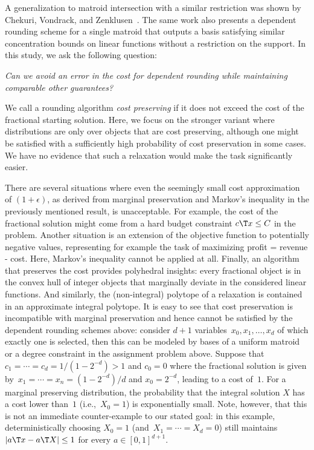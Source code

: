 A generalization to matroid intersection with a similar
restriction was shown by Chekuri, Vondrack, and Zenklusen~\cite{ChekuriVZ10}.
The same work also presents a dependent rounding
scheme for a single matroid that outputs a basis
satisfying similar concentration bounds on linear functions without a restriction on the support.
In this study, we ask the following question:
\begin{center}
    \medskip
    \emph{Can we avoid an error in the cost for dependent rounding while maintaining comparable other guarantees?}
    \medskip
\end{center}
We call a rounding algorithm \emph{cost preserving} if it does not
exceed the cost of the fractional starting solution.
Here, we focus on the stronger variant where distributions are only over objects that are cost preserving, although one might be satisfied with a sufficiently high probability of cost preservation in some
cases. We have no evidence that such a relaxation would make the task significantly easier.

There are several situations where even the seemingly
small cost approximation of $(1 + \epsilon)$, as derived from
marginal preservation and Markov's inequality in the previously mentioned result, is unacceptable. For example, the cost of the fractional solution might come from a hard budget constraint $c\T x \le C$ in the problem.
Another situation is an extension of the objective function to
potentially negative values, representing for example the task of
maximizing profit = revenue - cost. Here, Markov's inequality
cannot be applied at all. Finally, an algorithm that preserves the cost
provides polyhedral insights: every fractional object
is in the convex hull of integer objects that marginally deviate
 in the considered linear functions. And similarly, the (non-integral) polytope of a relaxation is
contained in an approximate integral polytope. 
It is easy to see that cost preservation is incompatible with marginal preservation and hence cannot be satisfied by the dependent rounding schemes above: consider $d+1$ variables~$x_0, x_1, \dotsc, x_d$
of which exactly one is selected, then this can be modeled by bases of a uniform matroid or a degree constraint in the assignment problem above.
Suppose that $c_1 = \cdots = c_{d} = 1/(1 - 2^{-d}) > 1$ and $c_0 = 0$ where the fractional solution is given by~$x_1 = \cdots = x_n = (1 - 2^{-d})/d$
and $x_0 = 2^{-d}$, leading to a cost of~$1$. For a marginal preserving distribution, the probability that the integral solution $X$ has a cost lower than~$1$ (i.e.,~$X_0 = 1$) is exponentially small.
Note, however, that this is not an immediate counter-example to our stated goal:
in this example, deterministically choosing $X_0 = 1$ (and~$X_1 = \cdots = X_d = 0$) still maintains
$|a\T x - a\T X| \le 1$ for every $a\in [0, 1]^{d+1}$. 
